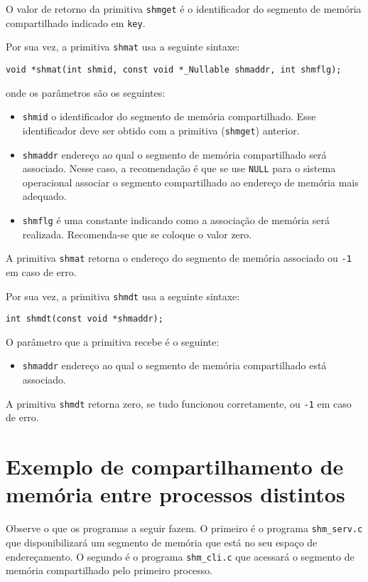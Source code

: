  O valor de retorno da primitiva \texttt{shmget} é o identificador do segmento de memória compartilhado indicado em \texttt{key}.

 Por sua vez, a primitiva \texttt{shmat} usa a seguinte sintaxe:

 \begin{lstlisting}[style=MyCStyle, frame=none, numbers=none]
    void *shmat(int shmid, const void *_Nullable shmaddr, int shmflg);
\end{lstlisting}
 
onde os parâmetros são os seguintes: 
\begin{itemize}
    \item \texttt{shmid} o identificador do segmento de memória compartilhado. Esse identificador deve ser obtido com a primitiva (\texttt{shmget}) anterior.
    \item \texttt{shmaddr} endereço ao qual o segmento de memória compartilhado será associado. Nesse caso, a recomendação é que se use \texttt{NULL} para o sistema operacional associar o segmento compartilhado ao endereço de memória mais adequado.
    \item \texttt{shmflg} é uma constante indicando como a associação de memória será realizada.  Recomenda-se que se coloque o valor zero.
\end{itemize}
     
 A primitiva \texttt{shmat} retorna o endereço do segmento de memória associado ou \texttt{-1} em caso de erro.


 Por sua vez, a primitiva \texttt{shmdt} usa a seguinte sintaxe:

 \begin{lstlisting}[style=MyCStyle, frame=none, numbers=none]
       int shmdt(const void *shmaddr);
\end{lstlisting}
 
O parâmetro que a primitiva recebe é o seguinte: 
\begin{itemize}
    \item \texttt{shmaddr} endereço ao qual o segmento de memória compartilhado está associado.
\end{itemize}
     
 A primitiva \texttt{shmdt} retorna zero, se tudo funcionou corretamente, ou \texttt{-1} em caso de erro.

\section{Exemplo de compartilhamento de memória entre processos distintos}
Observe o que os programas a seguir fazem. O primeiro é o programa \texttt{shm\_serv.c} que disponibilizará um segmento de memória que está no seu espaço de endereçamento. O segundo é o programa \texttt{shm\_cli.c} que acessará o segmento de memória compartilhado pelo primeiro processo.

